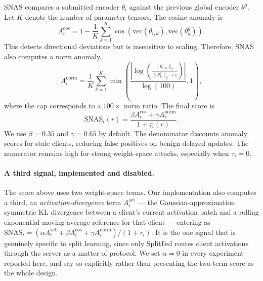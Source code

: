 \documentclass[pdflatex,sn-mathphys-num]{sn-jnl}
\begin{document}
SNAS compares a submitted encoder $\theta_i$ against the previous global encoder $\theta^g$. Let $K$ denote the number of parameter tensors. The cosine anomaly is
\begin{equation}
    A^{\mathrm{cos}}_i = 1 - \frac{1}{K}\sum_{k=1}^{K}\cos\left(\mathrm{vec}(\theta_{i,k}),\mathrm{vec}(\theta^g_{k})\right).
\end{equation}
This detects directional deviations but is insensitive to scaling. Therefore, SNAS also computes a norm anomaly,
\begin{equation}
    A^{\mathrm{norm}}_i = \frac{1}{K}\sum_{k=1}^{K}\min\left(\frac{\left|\log\left(\frac{\|\theta_{i,k}\|_2}{\|\theta^g_k\|_2+\epsilon}\right)\right|}{\log(100)},1\right),
\end{equation}
where the cap corresponds to a $100\times$ norm ratio. The final score is
\begin{equation}
    \mathrm{SNAS}_i(r)=\frac{\beta A^{\mathrm{cos}}_i + \gamma A^{\mathrm{norm}}_i}{1+\tau_i(r)}.
\end{equation}
We use $\beta=0.35$ and $\gamma=0.65$ by default. The denominator discounts anomaly scores for stale clients, reducing false positives on benign delayed updates. The numerator remains high for strong weight-space attacks, especially when $\tau_i=0$.

\paragraph{A third signal, implemented and disabled.} The score above uses two weight-space terms. Our implementation also computes a third, an \emph{activation-divergence} term $A^{\mathrm{act}}_i$ --- the Gaussian-approximation symmetric KL divergence between a client's current activation batch and a rolling exponential-moving-average reference for that client --- entering as $\mathrm{SNAS}_i = (\alpha A^{\mathrm{act}}_i + \beta A^{\mathrm{cos}}_i + \gamma A^{\mathrm{norm}}_i)/(1+\tau_i)$. It is the one signal that is genuinely specific to split learning, since only SplitFed routes client activations through the server as a matter of protocol. We set $\alpha=0$ in every experiment reported here, and say so explicitly rather than presenting the two-term score as the whole design.
\end{document}
